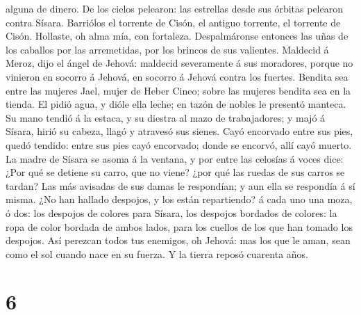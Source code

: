 alguna de dinero.  De los cielos pelearon: las estrellas
desde sus órbitas pelearon contra Sísara.  Barriólos el
torrente de Cisón, el antiguo torrente, el torrente de Cisón. Hollaste,
oh alma mía, con fortaleza.  Despalmáronse entonces las
uñas de los caballos por las arremetidas, por los brincos de sus
valientes.  Maldecid á Meroz, dijo el ángel de Jehová:
maldecid severamente á sus moradores, porque no vinieron en socorro á
Jehová, en socorro á Jehová contra los fuertes.  Bendita
sea entre las mujeres Jael, mujer de Heber Cineo; sobre las mujeres
bendita sea en la tienda.  El pidió agua, y dióle ella
leche; en tazón de nobles le presentó manteca.  Su mano
tendió á la estaca, y su diestra al mazo de trabajadores; y majó á
Sísara, hirió su cabeza, llagó y atravesó sus sienes.  Cayó
encorvado entre sus pies, quedó tendido: entre sus pies cayó encorvado;
donde se encorvó, allí cayó muerto.  La madre de Sísara se
asoma á la ventana, y por entre las celosías á voces dice: ¿Por qué se
detiene su carro, que no viene? ¿por qué las ruedas de sus carros se
tardan?  Las más avisadas de sus damas le respondían; y aun
ella se respondía á sí misma.  ¿No han hallado despojos, y
los están repartiendo? á cada uno una moza, ó dos: los despojos de
colores para Sísara, los despojos bordados de colores: la ropa de color
bordada de ambos lados, para los cuellos de los que han tomado los
despojos.  Así perezcan todos tus enemigos, oh Jehová: mas
los que le aman, sean como el sol cuando nace en su fuerza. Y la tierra
reposó cuarenta años.

\hypertarget{section-5}{%
\section{6}\label{section-5}}

